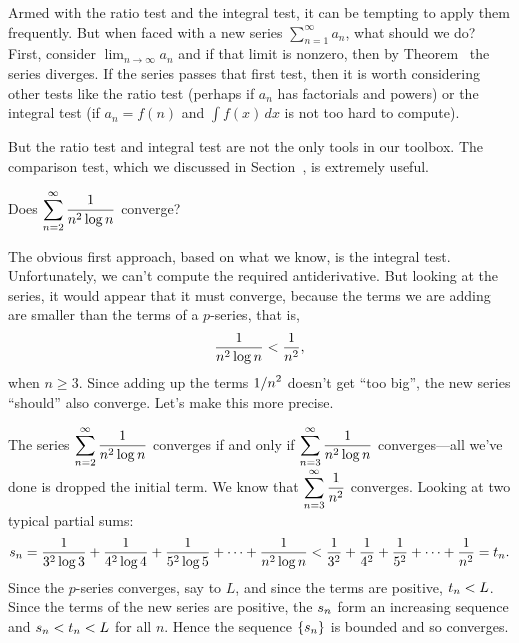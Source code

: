

Armed with the ratio test and the integral test, it can be tempting to
apply them frequently.  But when faced with a new series
$\sum_{n=1}^\infty a_n$, what should we do?  First, consider $\lim_{n
  \to \infty} a_n$ and if that limit is nonzero, then by
Theorem~ the series diverges.  If the series
passes that first test, then it is worth considering other tests like
the ratio test (perhaps if $a_n$ has factorials and powers) or the
integral test (if $a_n = f(n)$ and $\int f(x) \, dx$ is not too hard
to compute).

But the ratio test and integral test are not the only tools in our
toolbox.  The comparison test, which we discussed in
Section~, is extremely useful.

\begin{example} Does $\displaystyle\sum_{n=2}^\infty {1\over n^2\log n}$ converge?
\end{example}


\begin{solution}
The obvious first approach, based on what we know, is the integral test.
Unfortunately, we can't compute the required antiderivative. But
looking at the series, it would appear that it must converge, because
the terms we are adding are smaller than the terms of a $p$-series,
that is,
$${1\over n^2\log n}<{1\over n^2},$$
when $n\ge3$. Since adding up the terms $\displaystyle 1/n^2$ doesn't get ``too
big'', the new series ``should'' also converge. Let's make this more
precise.

The series $\displaystyle\sum_{n=2}^\infty {1\over n^2\log n}$ converges if and
only if $\displaystyle\sum_{n=3}^\infty {1\over n^2\log n}$ converges---all we've
done is dropped the initial term. We know that 
$\displaystyle\sum_{n=3}^\infty {1\over n^2}$ converges. Looking at two typical
partial sums:
$$
  s_n={1\over 3^2\log 3}+{1\over 4^2\log 4}+{1\over 5^2\log 5}+\cdots+
  {1\over n^2\log n} < {1\over 3^2}+{1\over 4^2}+
  {1\over 5^2}+\cdots+{1\over n^2}=t_n.
$$
Since the $p$-series converges, say to $L$, and since the terms are positive,
$\displaystyle t_n<L$. Since the terms of the new series are positive, the $\displaystyle s_n$
form an increasing sequence and $\displaystyle s_n<t_n<L$ for all $n$. Hence the
sequence $\displaystyle \{s_n\}$ is bounded and so converges.
\end{solution}


